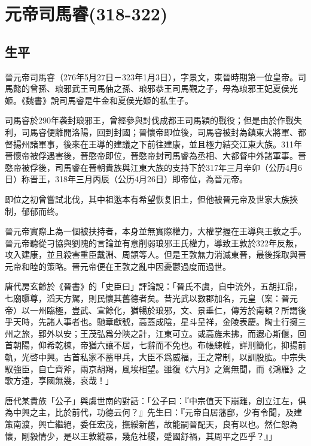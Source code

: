 
\section{元帝司馬睿\tiny(318-322)}

\subsection{生平}

晉元帝司馬睿（276年5月27日－323年1月3日），字景文，東晉時期第一位皇帝。司馬懿的曾孫、琅邪武王司馬伷之孫、琅邪恭王司馬覲之子，母為琅邪王妃夏侯光姬。《魏書》說司馬睿是牛金和夏侯光姬的私生子。

司馬睿於290年袭封琅邪王，曾經參與討伐成都王司馬穎的戰役；但是由於作戰失利，司馬睿便離開洛陽，回到封國；晉懷帝即位後，司馬睿被封為鎮東大將軍、都督揚州諸軍事，後來在王導的建議之下前往建康，並且極力結交江東大族。311年晉懷帝被俘遇害後，晉愍帝即位，晉愍帝封司馬睿為丞相、大都督中外諸軍事。晉愍帝被俘後，司馬睿在晉朝貴族與江東大族的支持下於317年三月辛卯（公历4月6日）称晋王，318年三月丙辰（公历4月26日）即帝位，為晉元帝。

即位之初曾嘗試北伐，其中祖逖本有希望恢复旧土，但他被晉元帝及世家大族挾制，郁郁而终。

晉元帝實際上為一個被扶持者，本身並無實際權力，大權掌握在王導與王敦之手。晉元帝聽從刁協與劉隗的言論並有意削弱琅邪王氏權力，導致王敦於322年反叛，攻入建康，並且殺害重臣戴淵、周顗等人。但是王敦無力消滅東晉，最後採取與晉元帝和睦的策略。晉元帝便在王敦之亂中因憂鬱過度而過世。

唐代房玄齡於《晉書》的「史臣曰」評論說：「晉氏不虞，自中流外，五胡扛鼎，七廟隳尊，滔天方駕，則民懷其舊德者矣。昔光武以數郡加名，元皇（案：晉元帝）以一州臨極，豈武、宣餘化，猶暢於琅邪，文、景垂仁，傳芳於南頓？所謂後乎天時，先諸人事者也。馳章獻號，高蓋成陰，星斗呈祥，金陵表慶。陶士行擁三州之旅，郢外以安；王茂弘爲分陝之計，江東可立。或高旌未拂，而遐心斯偃，回首朝陽，仰希乾棟，帝猶六讓不居，七辭而不免也。布帳綀帷，詳刑簡化，抑揚前軌，光啓中興。古首私家不蓄甲兵，大臣不爲威福，王之常制，以訓股肱。中宗失馭強臣，自亡齊斧，兩京胡羯，風埃相望。雖復《六月》之駕無聞，而《鴻雁》之歌方遠，享國無幾，哀哉！」

唐代某貴族「公子」與虞世南的對話：「公子曰：『中宗值天下崩離，創立江左，俱為中興之主，比於前代，功德云何？』先生曰：『元帝自居藩邸，少有令聞，及建策南渡，興亡繼絕，委任宏茂，撫綏新舊，故能嗣晉配天，良有以也。然仁恕為懷，剛毅情少，是以王敦縱暴，幾危社稷，蹙國舒禍，其周平之匹乎？』」

